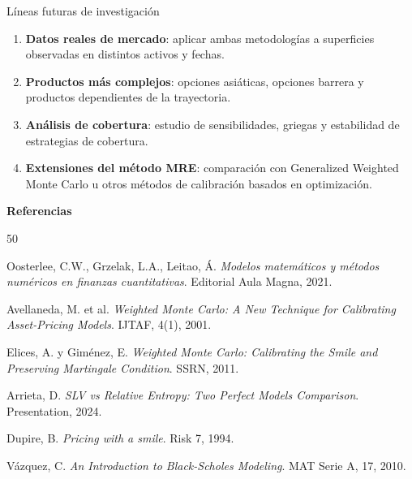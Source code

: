 \documentclass[8pt]{beamer}
\begin{document}
\begin{frame}{Líneas futuras de investigación}
    \begin{enumerate}
        \item \textbf{Datos reales de mercado}: aplicar ambas metodologías a superficies observadas en distintos activos y fechas.
        \pause
        
        \item \textbf{Productos más complejos}: opciones asiáticas, opciones barrera y productos dependientes de la trayectoria.
        \pause
        
        \item \textbf{Análisis de cobertura}: estudio de sensibilidades, griegas y estabilidad de estrategias de cobertura.
        \pause
        
        \item \textbf{Extensiones del método MRE}: comparación con Generalized Weighted Monte Carlo u otros métodos de calibración basados en optimización.
    \end{enumerate}
\end{frame}

\begin{frame}{\bf Referencias}
\begin{thebibliography}{50}
\scriptsize

   Oosterlee, C.W., Grzelak, L.A., Leitao, Á.
  {\em Modelos matemáticos y métodos numéricos en finanzas cuantitativas}. Editorial Aula Magna, 2021.

   Avellaneda, M. et al.
  {\em Weighted Monte Carlo: A New Technique for Calibrating Asset-Pricing Models}. IJTAF, 4(1), 2001.

   Elices, A. y Giménez, E.
  {\em Weighted Monte Carlo: Calibrating the Smile and Preserving Martingale Condition}. SSRN, 2011.

   Arrieta, D.
  {\em SLV vs Relative Entropy: Two Perfect Models Comparison}. Presentation, 2024.

   Dupire, B.
  {\em Pricing with a smile}. Risk 7, 1994.

   Vázquez, C.
  {\em An Introduction to Black-Scholes Modeling}. MAT Serie A, 17, 2010.

\end{thebibliography}
\end{frame}
\end{document}
